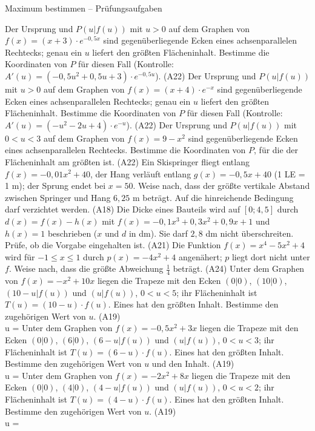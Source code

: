 \begin{aufgabe}{Maximum bestimmen – Prüfungsaufgaben}
\begin{teile}
\teil Der Ursprung und $P(u | f(u))$ mit $u > 0$ auf dem Graphen von $f(x) = (x + 3) \cdot e^{-0{,}5x}$ sind gegenüberliegende Ecken eines achsenparallelen Rechtecks; genau ein $u$ liefert den größten Flächeninhalt. Bestimme die Koordinaten von $P$ für diesen Fall (Kontrolle: $A'(u) = (-0{,}5u^2 + 0{,}5u + 3) \cdot e^{-0{,}5u}$). \hfill (A22)
\teil Der Ursprung und $P(u | f(u))$ mit $u > 0$ auf dem Graphen von $f(x) = (x + 4) \cdot e^{-x}$ sind gegenüberliegende Ecken eines achsenparallelen Rechtecks; genau ein $u$ liefert den größten Flächeninhalt. Bestimme die Koordinaten von $P$ für diesen Fall (Kontrolle: $A'(u) = (-u^2 - 2u + 4) \cdot e^{-u}$). \hfill (A22)
\teil Der Ursprung und $P(u | f(u))$ mit $0 < u < 3$ auf dem Graphen von $f(x) = 9 - x^2$ sind gegenüberliegende Ecken eines achsenparallelen Rechtecks. Bestimme die Koordinaten von $P$, für die der Flächeninhalt am größten ist. \hfill (A22)
\teil Ein Skispringer fliegt entlang $f(x) = -0{,}01x^2 + 40$, der Hang verläuft entlang $g(x) = -0{,}5x + 40$ (1 LE = 1 m); der Sprung endet bei $x = 50$. Weise nach, dass der größte vertikale Abstand zwischen Springer und Hang $6{,}25$ m beträgt. Auf die hinreichende Bedingung darf verzichtet werden. \hfill (A18)
\teil Die Dicke eines Bauteils wird auf $[0; 4{,}5]$ durch $d(x) = f(x) - h(x)$ mit $f(x) = -0{,}1x^3 + 0{,}3x^2 + 0{,}9x + 1$ und $h(x) = 1$ beschrieben ($x$ und $d$ in dm). Sie darf $2{,}8$ dm nicht überschreiten. Prüfe, ob die Vorgabe eingehalten ist. \hfill (A21)
\teil Die Funktion $f(x) = x^4 - 5x^2 + 4$ wird für $-1 \le x \le 1$ durch $p(x) = -4x^2 + 4$ angenähert; $p$ liegt dort nicht unter $f$. Weise nach, dass die größte Abweichung $\tfrac{1}{4}$ beträgt. \hfill (A24)
\teil Unter dem Graphen von $f(x) = -x^2 + 10x$ liegen die Trapeze mit den Ecken $(0 | 0)$, $(10 | 0)$, $(10 - u | f(u))$ und $(u | f(u))$, $0 < u < 5$; ihr Flächeninhalt ist $T(u) = (10 - u) \cdot f(u)$. Eines hat den größten Inhalt. Bestimme den zugehörigen Wert von $u$. \hfill (A19) \\ u = \leerfeld
\teil Unter dem Graphen von $f(x) = -0{,}5x^2 + 3x$ liegen die Trapeze mit den Ecken $(0 | 0)$, $(6 | 0)$, $(6 - u | f(u))$ und $(u | f(u))$, $0 < u < 3$; ihr Flächeninhalt ist $T(u) = (6 - u) \cdot f(u)$. Eines hat den größten Inhalt. Bestimme den zugehörigen Wert von $u$ und den Inhalt. \hfill (A19) \\ u = \leerfeld
\teil Unter dem Graphen von $f(x) = -2x^2 + 8x$ liegen die Trapeze mit den Ecken $(0 | 0)$, $(4 | 0)$, $(4 - u | f(u))$ und $(u | f(u))$, $0 < u < 2$; ihr Flächeninhalt ist $T(u) = (4 - u) \cdot f(u)$. Eines hat den größten Inhalt. Bestimme den zugehörigen Wert von $u$. \hfill (A19) \\ u = \leerfeld

\end{teile}
\end{aufgabe}

